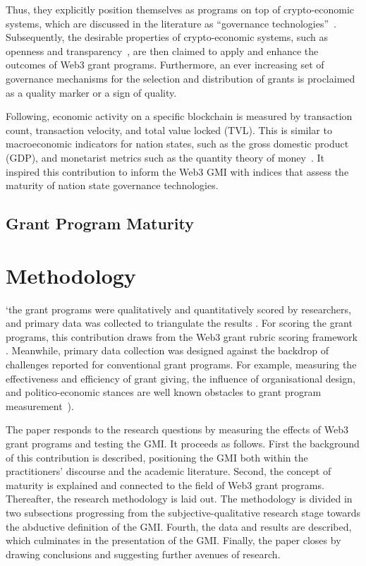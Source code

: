 \documentclass[conference]{IEEEtran}
\begin{document}
Thus, they explicitly position themselves as programs on top of crypto-economic systems, which are discussed in the literature as ``governance technologies''~\cite{brekke_hacker-engineers_2021,shermin_disrupting_2017}. Subsequently, the desirable properties of crypto-economic systems, such as openness and transparency~\cite[p.~54]{santos_dao_2018}, are then claimed to apply and enhance the outcomes of Web3 grant programs. Furthermore, an ever increasing set of governance mechanisms for the selection and distribution of grants is proclaimed as a quality marker or a sign of quality\cite{owocki_gitcoin_2024}.

Following, economic activity on a specific blockchain is measured by transaction count, transaction velocity, and total value locked (TVL). This is similar to macroeconomic indicators for nation states, such as the gross domestic product (GDP), and monetarist metrics such as the quantity theory of money~\cite{sun_understanding_2004}. It inspired this contribution to inform the Web3 GMI with indices that assess the maturity of nation state governance technologies.

\subsection{Grant Program Maturity}

\section{Methodology}\label{sec_3}


`the grant programs were qualitatively and quantitatively scored by researchers, and primary data was collected to triangulate the results \cite{creswell_designing_2017,datta_paradigm_2006}. For scoring the grant programs, this contribution draws from the Web3 grant rubric scoring framework \cite{biedermann_evaluating_2024}. Meanwhile, primary data collection was designed against the backdrop of challenges reported for conventional grant programs. For example, measuring the effectiveness and efficiency of grant giving, the influence of organisational design, and politico-economic stances are well known obstacles to grant program measurement~\cite{lerner_government_2000}).



The paper responds to the research questions by measuring the effects of Web3 grant programs and testing the GMI. It proceeds as follows. First the background of this contribution is described, positioning the GMI both within the practitioners’ discourse and the academic literature. Second, the concept of maturity is explained and connected to the field of Web3 grant programs. Thereafter, the research methodology is laid out. The methodology is divided in two subsections progressing from the subjective-qualitative research stage towards the abductive definition of the GMI. Fourth, the data and results are described, which culminates in the presentation of the GMI. Finally, the paper closes by drawing conclusions and suggesting further avenues of research.
\end{document}
